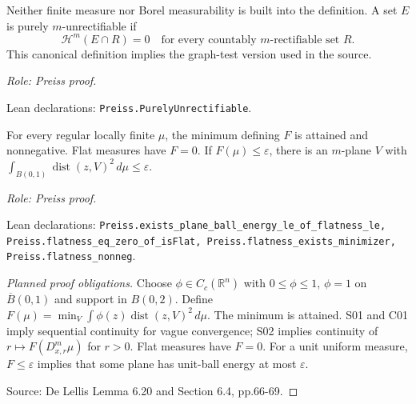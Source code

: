\begin{definition}
\label{def:purely-unrectifiable}








Neither finite measure nor Borel measurability is built into the definition.
A set \(E\) is purely \(m\)-unrectifiable if
\[
 \mathcal H^m(E\cap R)=0
 \quad\text{for every countably \(m\)-rectifiable set }R.
\]
This canonical definition implies the graph-test version used in the source.
\par\emph{Role: Preiss proof.}
\par Lean declarations: \texttt{Preiss.PurelyUnrectifiable}.
\end{definition}

\begin{lemma}
\label{lem:flatness-minimum}





For every regular locally finite $\mu$, the minimum defining $F$ is attained and nonnegative. Flat measures have $F=0$. If $F(\mu)\leq\varepsilon$, there is an $m$-plane $V$ with $\int_{B(0,1)}\operatorname{dist}(z,V)^2\,d\mu\leq\varepsilon$.
\par\emph{Role: Preiss proof.}
\par Lean declarations: \texttt{Preiss.exists\_plane\_ball\_energy\_le\_of\_flatness\_le, Preiss.flatness\_eq\_zero\_of\_isFlat, Preiss.flatness\_exists\_minimizer, Preiss.flatness\_nonneg}.
\end{lemma}
\begin{proof}[Planned proof obligations]

Choose $\phi\in C_c(\mathbb R^n)$ with $0\leq\phi\leq1$,
$\phi=1$ on $\overline B(0,1)$ and support in $B(0,2)$.
Define $F(\mu)=\min_V\int\phi(z)\operatorname{dist}(z,V)^2\,d\mu$.
The minimum is attained. S01 and C01 imply sequential continuity for vague
convergence; S02 implies continuity of $r\mapsto F(D^m_{x,r}\mu)$ for $r>0$.
Flat measures have $F=0$. For a unit uniform measure, $F\leq\varepsilon$
implies that some plane has unit-ball energy at most $\varepsilon$.
\par Source: De Lellis Lemma 6.20 and Section 6.4, pp.66-69.
\end{proof}


